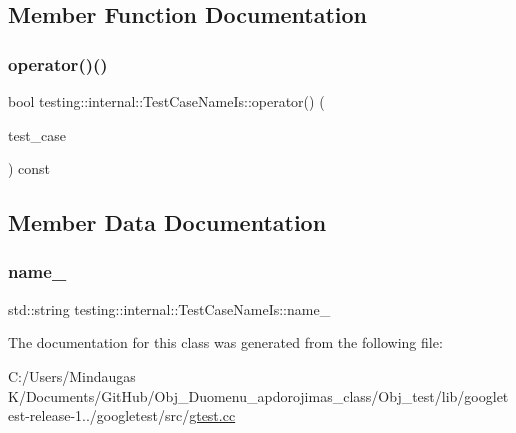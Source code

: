\subsection{Member Function Documentation}
\mbox{\label{classtesting_1_1internal_1_1_test_case_name_is_aa96c4e9facbaa7043c8f0b34465d1eae}} 
\subsubsection{\texorpdfstring{operator()()}{operator()()}}
{\footnotesize\ttfamily bool testing\+::internal\+::\+Test\+Case\+Name\+Is\+::operator() (\begin{DoxyParamCaption}\item[{const \mbox{\hyperlink{classtesting_1_1_test_case}{Test\+Case}} $\ast$}]{test\+\_\+case }\end{DoxyParamCaption}) const\hspace{0.3cm}{\ttfamily [inline]}}



\subsection{Member Data Documentation}
\mbox{\label{classtesting_1_1internal_1_1_test_case_name_is_a4e780c6613a81c4f14fc57e00c61474b}} 
\subsubsection{\texorpdfstring{name\_}{name\_}}
{\footnotesize\ttfamily std\+::string testing\+::internal\+::\+Test\+Case\+Name\+Is\+::name\+\_\+\hspace{0.3cm}{\ttfamily [private]}}



The documentation for this class was generated from the following file\+:\begin{DoxyCompactItemize}
\item 
C\+:/\+Users/\+Mindaugas K/\+Documents/\+Git\+Hub/\+Obj\+\_\+\+Duomenu\+\_\+apdorojimas\+\_\+class/\+Obj\+\_\+test/lib/googletest-\/release-\/1../googletest/src/\mbox{\hyperlink{_obj__test_2lib_2googletest-release-1_88_81_2googletest_2src_2gtest_8cc}{gtest.\+cc}}\end{DoxyCompactItemize}
